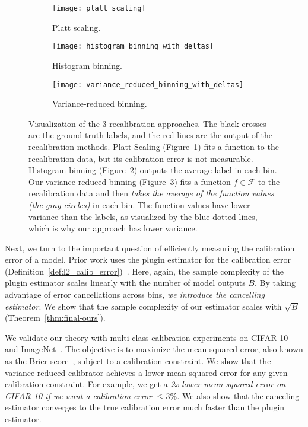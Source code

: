 \begin{figure}
     \centering
     \begin{subfigure}[b]{0.32\textwidth}
         \centering
         \texttt{[image: platt\_scaling]}
         \caption{Platt scaling.}
         \label{fig:platt_scaling}
     \end{subfigure}
     \hfill
     \begin{subfigure}[b]{0.32\textwidth}
         \centering
         \texttt{[image: histogram\_binning\_with\_deltas]}
         \caption{Histogram binning.}
         \label{fig:hist_binning}
     \end{subfigure}
     \hfill
     \begin{subfigure}[b]{0.32\textwidth}
         \centering
         \texttt{[image: variance\_reduced\_binning\_with\_deltas]}
         \caption{Variance-reduced binning.}
         \label{fig:var_red_binning}
     \end{subfigure}
        \caption{
        Visualization of the 3 recalibration approaches.
        The black crosses are the ground truth labels, and the red lines are the output of the recalibration methods.
        Platt Scaling (Figure~\ref{fig:platt_scaling}) fits a function to the recalibration data, but its calibration error is not measurable.
        Histogram binning (Figure~\ref{fig:hist_binning}) outputs the average label in each bin.
        Our variance-reduced binning (Figure~\ref{fig:var_red_binning}) fits a function $f \in \mathcal{F}$ to the recalibration data and then \emph{takes the average of the function values (the gray circles)} in each bin.
        The function values have lower variance than the labels, as visualized by the blue dotted lines, which is why our approach has lower variance. 
        }
        \label{fig:variance_reduced_illustration}
\end{figure}

Next, we turn to the important question of efficiently measuring the calibration error of a model.
Prior work uses the plugin estimator for the calibration error (Definition~\ref{def:l2_calib_error})~\cite{nguyen2015posterior, guo2017calibration, hendrycks2019anomaly, kuleshov2015calibrated, hendrycks2019pretraining}.
Here, again, the sample complexity of the plugin estimator scales linearly with the number of model outputs $B$.
By taking advantage of error cancellations across bins, \emph{we introduce the cancelling estimator}.
We show that the sample complexity of our estimator scales with $\sqrt{B}$ (Theorem~\ref{thm:final-ours}).

We validate our theory with multi-class calibration experiments on CIFAR-10~\cite{krizhevsky2009learningmultiple} and ImageNet~\cite{deng2009imagenet}.
The objective is to maximize the mean-squared error, also known as the Brier score~\cite{brier1950verification}, subject to a calibration constraint.
We show that the variance-reduced calibrator achieves a lower mean-squared error for any given calibration constraint.
For example, we get a \emph{2x lower mean-squared error on CIFAR-10 if we want a calibration error $\leq 3\%$.}
We also show that the canceling estimator converges to the true calibration error much faster than the plugin estimator.

